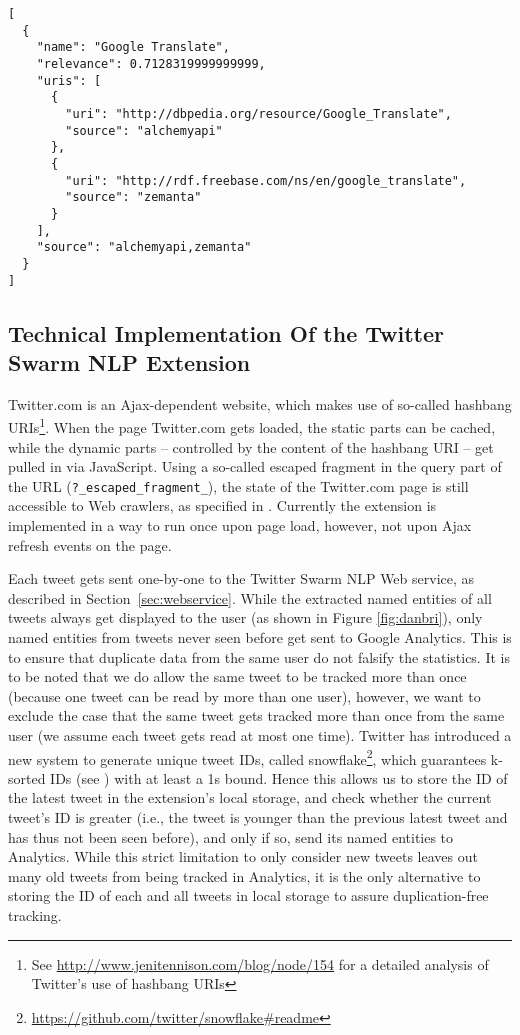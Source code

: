 \documentclass[runningheads,a4paper]{llncs}
\begin{document}
\begin{lstlisting}
[
  {
    "name": "Google Translate",
    "relevance": 0.7128319999999999,
    "uris": [
      {
        "uri": "http://dbpedia.org/resource/Google_Translate",
        "source": "alchemyapi"
      },
      {
        "uri": "http://rdf.freebase.com/ns/en/google_translate",
        "source": "zemanta"
      }
    ],
    "source": "alchemyapi,zemanta"
  }
]
\end{lstlisting}

\subsection{Technical Implementation Of the Twitter Swarm NLP Extension}
Twitter.com is an Ajax-dependent website, which makes use of so-called hashbang URIs\footnote{See \url{http://www.jenitennison.com/blog/node/154} for a detailed analysis of Twitter's use of hashbang URIs}. When the page Twitter.com gets loaded, the static parts can be cached, while the dynamic parts -- controlled by the content of the hashbang URI -- get pulled in via JavaScript. Using a so-called escaped fragment in the query part of the URL (\texttt{?\_escaped\_fragment\_}), the state of the Twitter.com page is still accessible to Web crawlers, as specified in \cite{Google:Ajax}. Currently the extension is implemented in a way to run once upon page load, however, not upon Ajax refresh events on the page.

Each tweet gets sent one-by-one to the Twitter Swarm NLP Web service, as described in Section~\ref{sec:webservice}. While the extracted named entities of all tweets always get displayed to the user (as shown in Figure \ref{fig:danbri}), only named entities from tweets never seen before get sent to Google Analytics. This is to ensure that duplicate data from the same user do not falsify the statistics. It is to be noted that we do allow the same tweet to be tracked more than once (because one tweet can be read by more than one user), however, we want to exclude the case that the same tweet gets tracked more than once from the same user (we assume each tweet gets read at most one time). Twitter has introduced a new system to generate unique tweet IDs, called snowflake\footnote{\url{https://github.com/twitter/snowflake#readme}}, which guarantees k-sorted IDs (see \cite{Altman:1989:RSS:70413.70419}) with at least a 1s bound. Hence this allows us to store the ID of the latest tweet in the extension's local storage, and check whether the current tweet's ID is greater (i.e., the tweet is younger than the previous latest tweet and has thus not been seen before),  and only if so, send its named entities to Analytics. While this strict limitation to only consider new tweets leaves out many old tweets from being tracked in Analytics, it is the only alternative to storing the ID of each and all tweets in local storage to assure duplication-free tracking.
\end{document}

